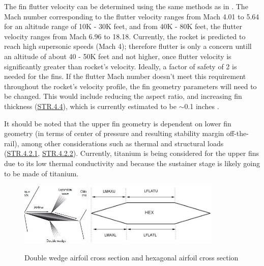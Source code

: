 The fin flutter velocity can be determined using the same methods as in . The Mach number corresponding to the flutter velocity ranges from Mach 4.01 to 5.64 for an altitude range of 10K - 30K feet, and from 40K - 80K feet, the flutter velocity ranges from Mach 6.96 to 18.18. Currently, the rocket is predicted to reach high supersonic speeds (Mach 4); therefore flutter is only a concern untill an altitude of about 40 - 50K feet and not higher, once flutter velocity is significantly greater than rocket's velocity. Ideally, a factor of safety of 2 is needed for the fins. If the flutter Mach number doesn't meet this requirement throughout the rocket's velocity profile, the fin geometry parameters will need to be changed.  This would include reducing the aspect ratio, and increasing fin thickness (\hyperlink{STR.4.4}{STR.4.4}), which is currently estimated to be \(\sim\)0.1 inches \cite{lf1}.

It should be noted that the upper fin geometry is dependent on lower fin geometry (in terms of center of pressure and resulting stability margin off-the-rail), among other considerations such as thermal and structural loads (\hyperlink{STR.4.2.1}{STR.4.2.1}, \hyperlink{STR.4.2.2}{STR.4.2.2}). Currently, titanium is being considered for the upper fins due to its low thermal conductivity and because the sustainer stage is likely going to be made of titanium.

\begin{figure}
    \centering
    \includegraphics[height=3cm]{images/double-wedge} \hspace{1.5cm} \includegraphics[height=3cm]{images/hexagonal}
    \caption{Double wedge airfoil cross section and hexagonal airfoil cross section}
    \label{figure:airfoil-cross-sections}
\end{figure}


